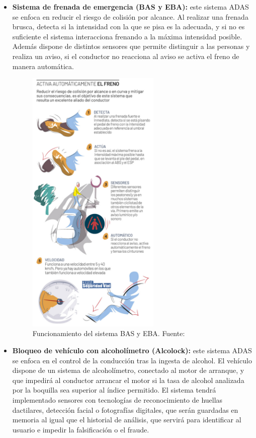 \documentclass[12pt]{report} %
\begin{document}
\begin{itemize}
\begin{figure}[H]
		\label{fig:imagen15}
	\end{figure}
	\item \textbf{Sistema de frenada de emergencia (BAS y EBA):} este sistema ADAS se enfoca en reducir el riesgo de colisión por alcance. Al realizar una frenada brusca, detecta si la intensidad con la que se pisa es la adecuada, y si no es suficiente el sistema interacciona frenando a la máxima intensidad posible. Además dispone de distintos sensores que permite distinguir a las personas y realiza un aviso, si el conductor no reacciona al aviso se activa el freno de manera automática.
    \begin{figure}[H]
		\centering
		\includegraphics[width=0.6\textwidth]{adasBASyEBA.jpg}
		\caption{Funcionamiento del sistema BAS y EBA. Fuente: \cite{adasObligatorios}}
		\label{fig:imagen16}
	\end{figure}
	\item \textbf{Bloqueo de vehículo con alcoholímetro (Alcolock):} este sistema ADAS se enfoca en el control de la conducción tras la ingesta de alcohol. El vehículo dispone de un sistema de alcoholímetro, conectado al motor de arranque, y que impedirá al conductor arrancar el motor si la tasa de alcohol analizada por la boquilla sea superior al índice permitido. El sistema tendrá implementado sensores con tecnologías de reconocimiento de huellas dactilares, detección facial o fotografías digitales, que serán guardadas en memoria al igual que el historial de análisis, que servirá para identificar al usuario e impedir la falsificación o el fraude.

\end{itemize}
\end{document}

